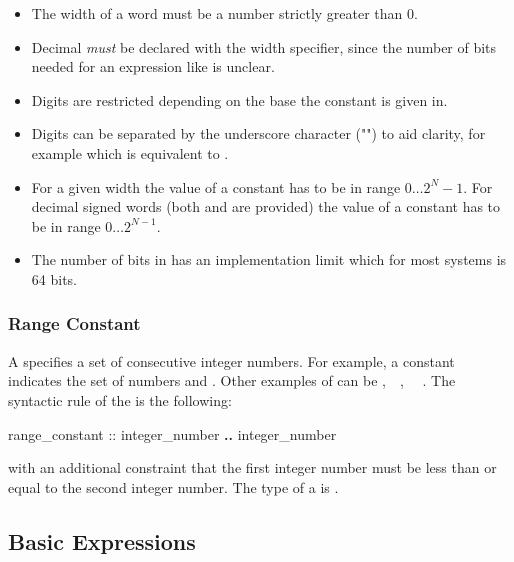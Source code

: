 \begin{itemize}
  \item The width of a word must be a number strictly greater than 0. 
  \item Decimal  \textit{must} be declared
        with the width specifier, since the number of bits needed for
        an expression like  is unclear.
  \item Digits are restricted depending on the base the constant is
        given in.
  \item Digits can be separated by the underscore character
        ("{\code{\_}}") to aid clarity, for example
         which is equivalent to
        .

 \item For a given width  the value of a constant has to be in
       range $0 \ldots 2^{N}-1$. For decimal signed words (both 
       and  are provided) the value of a constant has to be in
       range $0 \ldots 2^{N-1}$.

 \item The number of bits in  has an implementation
       limit which for most systems is 64 bits.
\end{itemize}

\subsubsection{Range Constant}
\label{Range Constant}

A  specifies a set of consecutive integer
numbers. For example, a constant  indicates the set of
numbers  and . Other examples of
 can be ,\ \ ,
\ \ . 
The syntactic rule of the  is the following:
\begin{Grammar}
range_constant :: 
        integer_number \textbf{..} integer_number
\end{Grammar}
with an additional constraint that the first integer number must be
less than or equal to the second integer number.
%
The type of a  is \IntSet.

\subsection{Basic Expressions}
\label{Basic Expressions}



